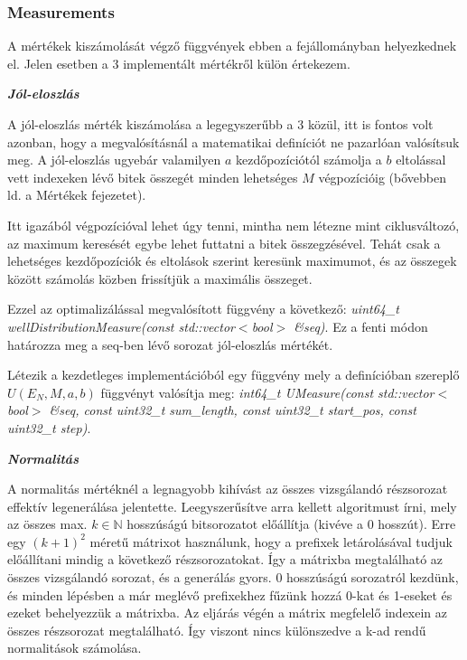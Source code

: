 \documentclass[hidelinks, 12pt]{article}
\begin{document}
\subsubsection*{Measurements}
A mértékek kiszámolását végző függvények ebben a fejállományban helyezkednek el. Jelen esetben a 3 implementált mértékről külön értekezem.

\textit{\textbf{Jól-eloszlás}}

A jól-eloszlás mérték kiszámolása a legegyszerűbb a 3 közül, itt is fontos volt azonban, hogy a megvalósításnál a matematikai definíciót ne pazarlóan valósítsuk meg. A jól-eloszlás ugyebár valamilyen $a$ kezdőpozíciótól számolja a $b$ eltolással vett indexeken lévő bitek összegét minden lehetséges $M$ végpozícióig (bővebben ld. a Mértékek fejezetet).

Itt igazából végpozícióval lehet úgy tenni, mintha nem létezne mint ciklusváltozó, az maximum keresését egybe lehet futtatni a bitek összegzésével. Tehát csak a lehetséges kezdőpozíciók és eltolások szerint keresünk maximumot, és az összegek között számolás közben frissítjük a maximális összeget. 

Ezzel az optimalizálással megvalósított függvény a következő: \textit{uint64\_t wellDistributionMeasure(const std::vector$<$bool$>$ \&seq)}. Ez a fenti módon határozza meg a seq-ben lévő sorozat jól-eloszlás mértékét.

Létezik a kezdetleges implementációból egy függvény mely a definícióban szereplő $U(E_N, M, a, b)$ függvényt valósítja meg: \textit{int64\_t UMeasure(const std::vector$<$bool$>$ \&seq, const uint32\_t sum\_length, const uint32\_t start\_pos, const uint32\_t step)}.

\textit{\textbf{Normalitás}}

A normalitás mértéknél a legnagyobb kihívást az összes vizsgálandó részsorozat effektív legenerálása jelentette. Leegyszerűsítve arra kellett algoritmust írni, mely az összes max. $k \in \mathbb{N}$ hosszúságú bitsorozatot előállítja (kivéve a 0 hosszút). Erre egy $(k+1)^2$ méretű mátrixot használunk, hogy a prefixek letárolásával tudjuk előállítani mindig a következő részsorozatokat. Így a mátrixba megtalálható az összes vizsgálandó sorozat, és a generálás gyors. 0 hosszúságú sorozatról kezdünk, és minden lépésben a már meglévő prefixekhez fűzünk hozzá 0-kat és 1-eseket és ezeket behelyezzük a mátrixba. Az eljárás végén a mátrix megfelelő indexein az összes részsorozat megtalálható. Így viszont nincs különszedve a k-ad rendű normalitások számolása.
\end{document}
